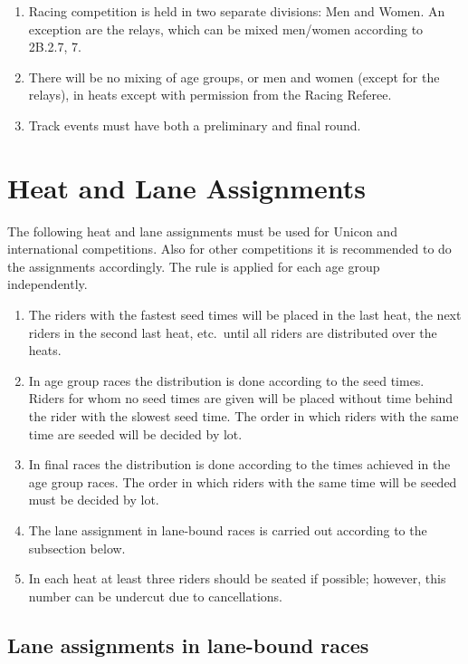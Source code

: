 \begin{enumerate}[leftmargin=1.5em,labelsep=*]
	\item Racing competition is held in two separate divisions: Men and Women. An exception are the relays, 
  which can be mixed men/women according to 2B.2.7, 7.

	\item There will be no mixing of age groups, or men and women (except for the relays), 
  in heats except with permission from the Racing Referee.

	\item Track events must have both a preliminary and final round.
\end{enumerate}

\section{Heat and Lane Assignments}

The following heat and lane assignments must be used for Unicon and international competitions.
Also for other competitions it is recommended to do the assignments accordingly.
The rule is applied for each age group independently.
\begin{enumerate}[leftmargin=1.5em,labelsep=*]
	\item The riders with the fastest seed times will be placed in the last heat, 
   the next riders in the second last heat, etc.\ until all riders are distributed over the heats.
	\item In age group races the distribution is done according to the seed times.
    Riders for whom no seed times are given will be placed without time behind the rider with the slowest seed time.
    The order in which riders with the same time are seeded will be decided by lot.
	\item In final races the distribution is done according to the times achieved in the age group races.
	The order in which riders with the same time will be seeded must be decided by lot.
	\item The lane assignment in lane-bound races is carried out according to the subsection below.
	\item In each heat at least three riders should be seated if possible; 
    however, this number can be undercut due to cancellations.
\end{enumerate}

\subsection{Lane assignments in lane-bound races}

